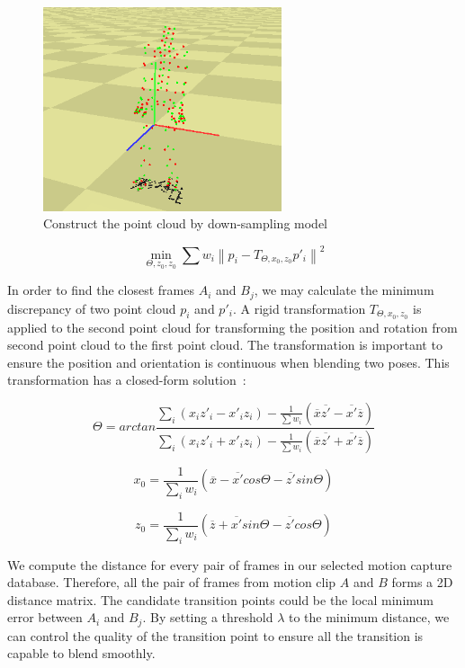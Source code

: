 \begin{figure}
\centering
\includegraphics [width=70mm] {Images/point_cloud} 
\caption{Construct the point cloud by down-sampling model}
\label{fig:point_cloud}
\end{figure}

\begin {equation}
\min_{\Theta,z_0,z_0} \sum w_i\left \| p_i-T_{\Theta,x_0,z_0}p'_i \right \|^2
\end {equation}

In order to find the closest frames $A_i$ and $B_j$, we may calculate the 
minimum discrepancy of two point cloud $p_i$ and $p'_i$. A rigid transformation $T_{\Theta,x_0,z_0}$
is applied to the second point cloud for transforming the position and rotation 
from second point cloud to the first point cloud. The transformation is important 
to ensure the position and orientation is continuous when blending two poses. 
This transformation has a closed-form solution~\cite{kovar2002}:

\begin {equation}
\Theta = arctan\frac{\sum_i (x_i z'_i - x'_i z_i)-\frac{1}{\sum w_i}(\overline{x}\overline{z'}-\overline{x'}\overline{z})}
{\sum_i (x_i z'_i + x'_i z_i)-\frac{1}{\sum w_i}(\overline{x}\overline{z'} +\overline{x'}\overline{z})}
\end {equation}

\begin {equation}
x_0 = \frac{1}{\sum_i w_i} (\overline{x}-\overline{x'}cos\Theta-\overline{z'}sin\Theta)
\end {equation}

\begin {equation}
z_0 = \frac{1}{\sum_i w_i} (\overline{z}+\overline{x'}sin\Theta-\overline{z'}cos\Theta)
\end {equation}

We compute the distance for every pair of frames in our selected motion capture 
database. Therefore, all the pair of frames from motion clip $A$ and $B$ forms a 
2D distance matrix. 
The candidate transition points could be the local minimum error between $A_i$ 
and $B_j$. 
By setting a threshold $\lambda$ to the minimum distance, we can control the quality of the transition 
point to ensure all the transition is capable to blend smoothly.



